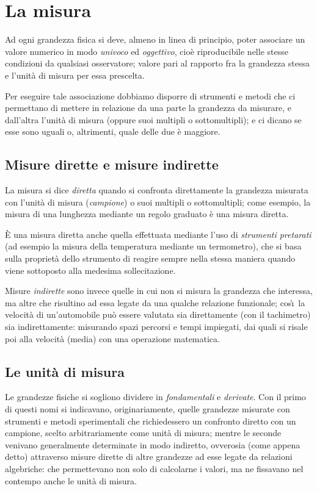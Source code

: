 
\chapter{La misura}
Ad ogni grandezza fisica si deve, almeno in linea di
principio, poter associare un valore numerico in modo
\emph{univoco} ed \emph{oggettivo}, cio\`e riproducibile
nelle stesse condizioni da qualsiasi osservatore; valore
pari al rapporto fra la grandezza stessa e l'unit\`a di
misura per essa prescelta.

Per eseguire tale associazione dobbiamo disporre di
strumenti e metodi che ci permettano di mettere in relazione
da una parte la grandezza da misurare, e dall'altra
l'unit\`a di misura (oppure suoi multipli o sottomultipli);
e ci dicano se esse sono uguali o, altrimenti, quale delle
due \`e maggiore.

\section{Misure dirette e misure indirette}
La misura si dice \emph{diretta}%
quando si confronta direttamente la grandezza misurata con
l'unit\`a di misura (\emph{campione}) o suoi multipli o
sottomultipli; come esempio, la misura di una lunghezza
mediante un regolo graduato \`e una misura diretta.

\`E una misura diretta anche quella effettuata mediante
l'uso di \emph{strumenti pretarati} (ad esempio la misura
della temperatura mediante un termometro), che si basa sulla
propriet\`a dello strumento di reagire sempre nella stessa
maniera quando viene sottoposto alla medesima
sollecitazione.

Misure \emph{indirette}%
sono invece quelle in cui non si misura la grandezza che
interessa, ma altre che risultino ad essa legate da una
qualche relazione funzionale; cos\`\i\ la velocit\`a di
un'automobile pu\`o essere valutata sia direttamente (con il
tachimetro) sia indirettamente: misurando spazi percorsi e
tempi impiegati, dai quali si risale poi alla velocit\`a
(media) con una operazione matematica.

\section{Le unit\`a di misura}%
Le grandezze fisiche si sogliono dividere in
\emph{fondamentali} e \emph{derivate}.  Con il primo di
questi nomi si indicavano, originariamente, quelle grandezze
misurate con strumenti e metodi sperimentali che
richiedessero un confronto diretto con un campione, scelto
arbitrariamente come unit\`a di misura; mentre le seconde
venivano generalmente determinate in modo indiretto,
ovverosia (come appena detto) attraverso misure dirette di
altre grandezze ad esse legate da relazioni algebriche: che
permettevano non solo di calcolarne i valori, ma ne
fissavano nel contempo anche le unit\`a di misura.

